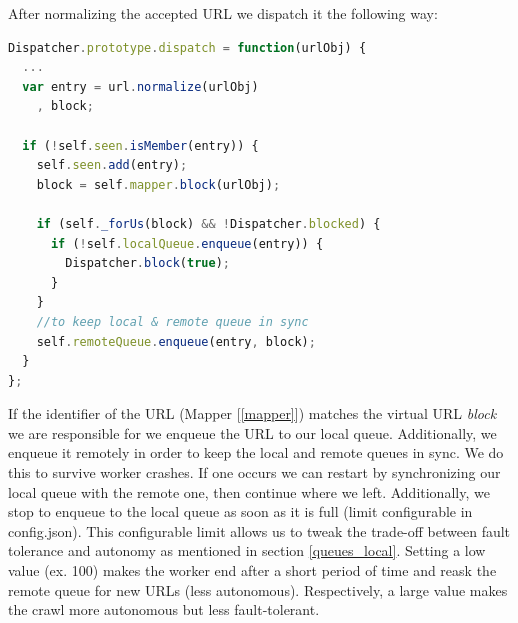 After normalizing the accepted URL we dispatch it the following way:

\begin{lstlisting}[language=JavaScript]
Dispatcher.prototype.dispatch = function(urlObj) {
  ...
  var entry = url.normalize(urlObj)
    , block;
  
  if (!self.seen.isMember(entry)) {
    self.seen.add(entry);
    block = self.mapper.block(urlObj);
  
    if (self._forUs(block) && !Dispatcher.blocked) {
      if (!self.localQueue.enqueue(entry)) {
        Dispatcher.block(true);
      }                                                                                                                                
    }
    //to keep local & remote queue in sync
    self.remoteQueue.enqueue(entry, block);
  }
};
\end{lstlisting}

If the identifier of the URL (Mapper [\ref{mapper}]) matches the virtual URL \emph{block} we are responsible for we enqueue the URL to our local queue. Additionally, we enqueue it remotely in order to keep the local and remote queues in sync. We do this to survive worker crashes. If one occurs we can restart by synchronizing our local queue with the remote one, then continue where we left. Additionally, we stop to enqueue to the local queue as soon as it is full (limit configurable in config.json). This configurable limit allows us to tweak the trade-off between fault tolerance and autonomy as mentioned in section \ref{queues_local}. Setting a low value (ex. 100) makes the worker end after a short period of time and reask the remote queue for new URLs (less autonomous). Respectively, a large value makes the crawl more autonomous but less fault-tolerant.

